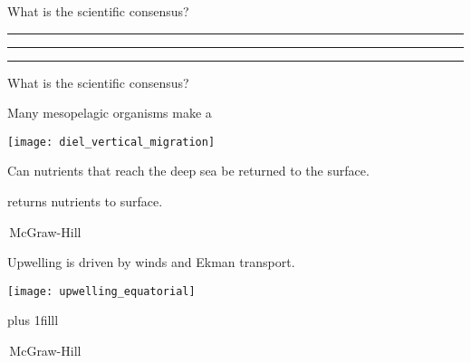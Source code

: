 \documentclass[t]{beamer}
\begin{document}
\begin{frame}[t]{What is the scientific consensus?}

\hangpara \rule{2.5in}{0.4pt}

\vspace*{2\baselineskip}

\hangpara \rule{2.5in}{0.4pt}

\vspace*{2\baselineskip}

\hangpara \rule{2.5in}{0.4pt}

\end{frame}





\begin{frame}[t]{What is the scientific consensus?}

\hangpara{}\pause

\vspace*{2\baselineskip}

\hangpara{}\pause

\vspace*{2\baselineskip}

\hangpara{}

\end{frame}



\begin{frame}[t]{Many mesopelagic organisms make a }

	{\centering
	\texttt{[image: diel\_vertical\_migration]}\par}

\end{frame}


\begin{frame}[t]{Can nutrients that reach the deep sea be returned to the surface.}
\end{frame}


{
\begin{frame}[b]{ returns nutrients to surface.}

\hfill\tiny\textcopyright\,McGraw-Hill
\end{frame}}


\begin{frame}[t]{Upwelling is driven by winds and Ekman transport.}

{\centering
\texttt{[image: upwelling\_equatorial]}\par}

\vskip0pt plus 1filll

\hfill\tiny\textcopyright\,McGraw-Hill
\end{frame}
\end{document}
